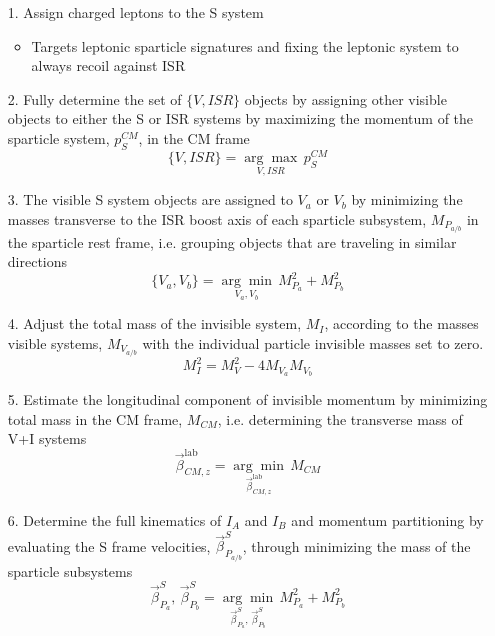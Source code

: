 \begin{itemize}
\item[1.] Assign charged leptons to the S system
\begin{itemize}
	\item Targets leptonic sparticle signatures and fixing the leptonic system to always recoil against ISR
\end{itemize}
\item[2.] Fully determine the set of $\{V,ISR\}$ objects by assigning other visible objects to either the S or ISR systems by maximizing the momentum of the sparticle system, $p_S^{CM}$, in the CM frame
\begin{equation}
\{V,ISR\} =  \underset{V,ISR}{\arg\max} \, p_S^{CM}
\end{equation}
\item[3.] The visible S system objects are assigned to $V_a$ or $V_b$ by minimizing the masses transverse to the ISR boost axis of each sparticle subsystem, $M_{P_{a/b}}$ in the sparticle rest frame, i.e. grouping objects that are traveling in similar directions
\begin{equation}
\{V_a,V_b\} = \underset{V_a,V_b}{\arg\min} \, M_{P_a}^2 + M_{P_b}^2
\end{equation}
\item[4.] Adjust the total mass of the invisible system, $M_I$, according to the masses visible systems, $M_{V_{a/b}}$ with the individual particle invisible masses set to zero.
\begin{equation}
M_I^2 = M_V^2 - 4M_{V_a}M_{V_b}
\end{equation}
\item[5.] Estimate the longitudinal component of invisible momentum by minimizing total mass in the CM frame, $M_{CM}$, i.e. determining the transverse mass of V+I systems
\begin{equation}
 \vec{\beta}_{CM,z}^{\text{lab}} = \underset{\vec{\beta}_{CM,z}^{\text{lab}} } {\arg\min} \, M_{CM}
\end{equation}
\item[6.] Determine the full kinematics of $I_A$ and $I_B$ and momentum partitioning  by evaluating the S frame velocities, $\vec{\beta}_{P_{a/b}}^S$, through minimizing the mass of the sparticle subsystems
\begin{equation}
\vec{\beta}_{P_a}^S, \, \vec{\beta}_{P_b}^S = \underset{\vec{\beta}_{P_a}^S, \, \vec{\beta}_{P_b}^S}{\arg\min} \, M_{P_a}^2 + M_{P_b}^2
\end{equation}
\end{itemize}

